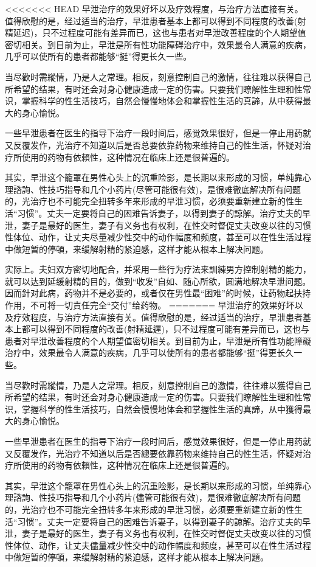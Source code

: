 \documentclass[12pt,UTF8]{ctexbook}
\begin{document}
<<<<<<< HEAD
早泄治疗的效果好坏以及疗效程度，与治疗方法直接有关。值得欣慰的是，经过适当的治疗，早泄患者基本上都可以得到不同程度的改善(射精延迟)，只不过程度可能有差异而已，这也与患者对早泄改善程度的个人期望值密切相关。到目前为止，早泄是所有性功能障碍治疗中，效果最令人满意的疾病，几乎可以使所有的患者都能够“挺”得更长久一些。

当尽歡时需縱情，乃是人之常理。相反，刻意控制自己的激情，往往难以获得自己所希望的结果，有时还会对身心健康造成一定的伤害。只要我们瞭解性生理和性常识，掌握科学的性生活技巧，自然会慢慢地体会和掌握性生活的真諦，从中获得最大的身心愉悦。

一些早泄患者在医生的指导下治疗一段时间后，感觉效果很好，但是一停止用药就又反覆发作，光治疗不知道以后是否总要依靠药物来维持自己的性生活，怀疑对治疗所使用的药物有依賴性，这种情况在临床上还是很普遍的。

其实，早泄这个籠罩在男性心头上的沉重险影，是长期以来形成的习惯，单纯靠心理諮詢、性技巧指导和几个小药片(尽管可能很有效)，是很难徹底解决所有问题的，光治疗也不可能完全扭转多年来形成的早泄习惯，必须要重新建立新的性生活“习惯”。丈夫一定要将自己的困难告诉妻子，以得到妻子的諒解。治疗丈夫的早泄，妻子是最好的医生，妻子有义务也有权利，在性交时督促丈夫改变以往的习惯性体位、动作，让丈夫尽量减少性交中的动作幅度和频度，甚至可以在性生活过程中做短暂的停頓，来缓解射精的紧迫感，这样才能从根本上解决问题。

实际上。夫妇双方密切地配合，并采用一些行为疗法来訓練男方控制射精的能力，就可以达到延缓射精的目的，做到“收发”自如、随心所欲，圆满地解决早泄问题。因而針对此病，药物并不是必要的，或者仅在男性最“困难”的时候，让药物起扶持作用，不可将一切責任完全“交付”给药物。
=======
早泄治疗的效果好坏以及疗效程度，与治疗方法直接有关。值得欣慰的是，经过适当的治疗，早泄患者基本上都可以得到不同程度的改善(射精延遲)，只不过程度可能有差异而已，这也与患者对早泄改善程度的个人期望值密切相关。到目前为止，早泄是所有性功能障礙治疗中，效果最令人满意的疾病，几乎可以使所有的患者都能够“挺”得更长久一些。

当尽歡时需縱情，乃是人之常理。相反，刻意控制自己的激情，往往难以獲得自己所希望的结果，有时还会对身心健康造成一定的伤害。只要我们瞭解性生理和性常识，掌握科学的性生活技巧，自然会慢慢地体会和掌握性生活的真諦，从中獲得最大的身心愉悦。

一些早泄患者在医生的指导下治疗一段时间后，感觉效果很好，但是一停止用药就又反覆发作，光治疗不知道以后是否總要依靠药物来维持自己的性生活，怀疑对治疗所使用的药物有依賴性，这种情况在临床上还是很普遍的。

其实，早泄这个籠罩在男性心头上的沉重险影，是长期以来形成的习惯，单纯靠心理諮詢、性技巧指导和几个小药片(儘管可能很有效)，是很难徹底解决所有问題的，光治疗也不可能完全扭转多年来形成的早泄习惯，必须要重新建立新的性生活“习惯”。丈夫一定要将自己的困难告诉妻子，以得到妻子的諒解。治疗丈夫的早泄，妻子是最好的医生，妻子有义务也有权利，在性交时督促丈夫改变以往的习惯性体位、动作，让丈夫儘量减少性交中的动作幅度和频度，甚至可以在性生活过程中做短暂的停頓，来缓解射精的紧迫感，这样才能从根本上解决问題。
\end{document}
